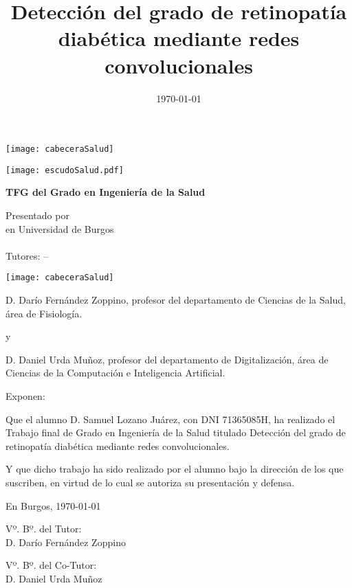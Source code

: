 \documentclass[a4paper,12pt,twoside]{memoir}
\title{Detección del grado de retinopatía diabética mediante redes convolucionales}
\author{\nombre}
\date{\today}
\makeatletter
\def\maketitle{
  \null
  \thispagestyle{empty}
\begin{center}
  \noindent\texttt{[image: cabeceraSalud]}\vspace{1.5cm}%
\end{center}
  
  \begin{center}
    \begin{minipage}[c][1.5cm][c]{.20\textwidth}
        \texttt{[image: escudoSalud.pdf]}
    \end{minipage}
  \end{center}
  
  \begin{center}
    \colorbox{cpardoBox}{%
        \begin{minipage}{.8\textwidth}
          \vspace{.5cm}\Large
          \begin{center}
          \textbf{TFG del Grado en Ingeniería de la Salud}\vspace{.6cm}\\
          \textbf{\LARGE\@title{}}
          \end{center}
          \vspace{.2cm}
        \end{minipage}
    }%
  \end{center}
  
  \begin{center}%
  {%
    \noindent\LARGE
    Presentado por \@author{}\\ 
    en Universidad de Burgos\\
    \vspace{0.5cm}
    \noindent\Large
    \@date{}\\
    \vspace{0.5cm}
    Tutores: \@tutor{} -- \@tutorb{}\\
  }%
  \end{center}%
  \null
  \cleardoublepage
  }
\newcommand{\nombre}{Samuel Lozano Juárez}
\newcommand{\nombreTutor}{Darío Fernández Zoppino}
\newcommand{\nombreTutorb}{Daniel Urda Muñoz}
\newcommand{\dni}{71365085H}
\makeatother
\begin{document}
\maketitle


\newpage\null\thispagestyle{empty}\newpage

\thispagestyle{empty}


\noindent\texttt{[image: cabeceraSalud]}\vspace{1cm}

\noindent D. \nombreTutor, profesor del departamento de Ciencias de la Salud, área de Fisiología.

y

\noindent D. \nombreTutorb, profesor del departamento de Digitalización, área de Ciencias de la Computación e Inteligencia Artificial.

\noindent Exponen:

\noindent Que el alumno D. \nombre, con DNI \dni, ha realizado el Trabajo final de Grado en Ingeniería de la Salud titulado Detección del grado de retinopatía diabética mediante redes convolucionales. 

\noindent Y que dicho trabajo ha sido realizado por el alumno bajo la dirección de los que suscriben, en virtud de lo cual se autoriza su presentación y defensa.

\begin{center} %
En Burgos, {\large \today}
\end{center}

\vfill\vfill\vfill

\begin{minipage}{0.45\textwidth}
\begin{flushleft} %
Vº. Bº. del Tutor:\\[2cm]
D. \nombreTutor
\end{flushleft}
\end{minipage}
\hfill
\begin{minipage}{0.45\textwidth}
\begin{flushleft} %
Vº. Bº. del Co-Tutor:\\[2cm]
D. \nombreTutorb
\end{flushleft}
\end{minipage}
\hfill

\vfill

\end{document}
